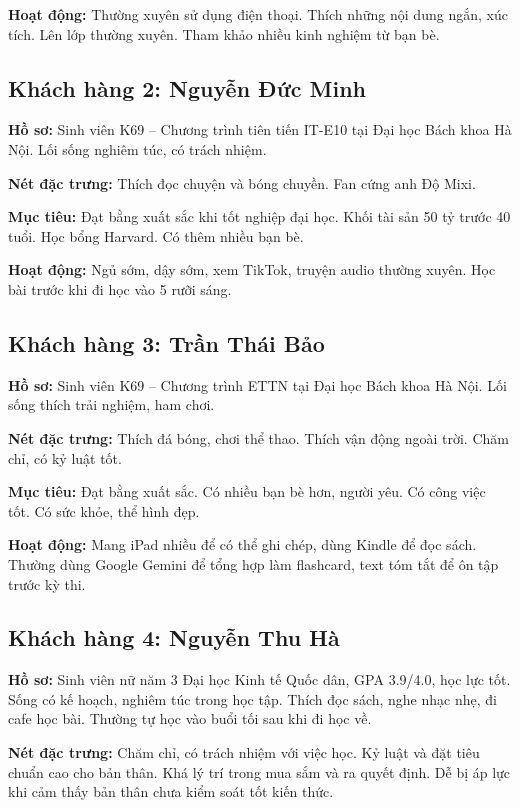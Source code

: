 \documentclass[12pt,a4paper]{report}
\begin{document}
\textbf{Hoạt động:} Thường xuyên sử dụng điện thoại. Thích những nội dung ngắn, xúc tích. Lên lớp thường xuyên. Tham khảo nhiều kinh nghiệm từ bạn bè.

\subsection*{Khách hàng 2: Nguyễn Đức Minh}
\textbf{Hồ sơ:} Sinh viên K69 -- Chương trình tiên tiến IT-E10 tại Đại học Bách khoa Hà Nội. Lối sống nghiêm túc, có trách nhiệm.

\textbf{Nét đặc trưng:} Thích đọc chuyện và bóng chuyền. Fan cứng anh Độ Mixi.

\textbf{Mục tiêu:} Đạt bằng xuất sắc khi tốt nghiệp đại học. Khối tài sản 50 tỷ trước 40 tuổi. Học bổng Harvard. Có thêm nhiều bạn bè.

\textbf{Hoạt động:} Ngủ sớm, dậy sớm, xem TikTok, truyện audio thường xuyên. Học bài trước khi đi học vào 5 rưỡi sáng.

\subsection*{Khách hàng 3: Trần Thái Bảo}
\textbf{Hồ sơ:} Sinh viên K69 -- Chương trình ETTN tại Đại học Bách khoa Hà Nội. Lối sống thích trải nghiệm, ham chơi.

\textbf{Nét đặc trưng:} Thích đá bóng, chơi thể thao. Thích vận động ngoài trời. Chăm chỉ, có kỷ luật tốt.

\textbf{Mục tiêu:} Đạt bằng xuất sắc. Có nhiều bạn bè hơn, người yêu. Có công việc tốt. Có sức khỏe, thể hình đẹp.

\textbf{Hoạt động:} Mang iPad nhiều để có thể ghi chép, dùng Kindle để đọc sách. Thường dùng Google Gemini để tổng hợp làm flashcard, text tóm tắt để ôn tập trước kỳ thi.

\subsection*{Khách hàng 4: Nguyễn Thu Hà}
\textbf{Hồ sơ:} Sinh viên nữ năm 3 Đại học Kinh tế Quốc dân, GPA 3.9/4.0, học lực tốt. Sống có kế hoạch, nghiêm túc trong học tập. Thích đọc sách, nghe nhạc nhẹ, đi cafe học bài. Thường tự học vào buổi tối sau khi đi học về.

\textbf{Nét đặc trưng:} Chăm chỉ, có trách nhiệm với việc học. Kỷ luật và đặt tiêu chuẩn cao cho bản thân. Khá lý trí trong mua sắm và ra quyết định. Dễ bị áp lực khi cảm thấy bản thân chưa kiểm soát tốt kiến thức.
\end{document}
